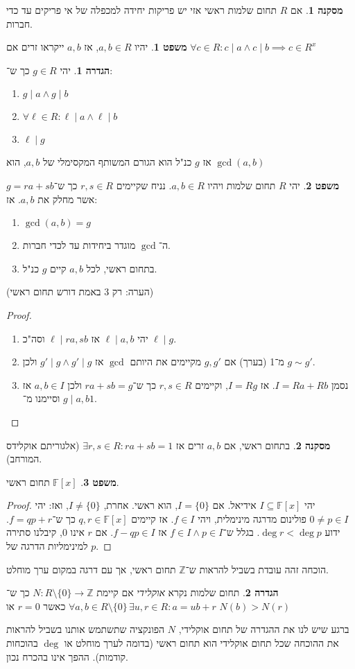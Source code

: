 \documentclass[a4paper]{article}
\newcommand\Z     {\mathbb{Z}}
\newcommand\ml    {\ell}
\newcommand\F         {\mathbb{F}}
\newcommand\co        {\colon}
\theoremstyle{definition}
\newtheorem{Theorem}{משפט}
\newtheorem{definition}{הגדרה}
\newtheorem{Collary}{מסקנה}
\newcommand\cola [1] {\begin{Collary}#1\end{Collary}}
\newcommand\theo  [1] {\begin{Theorem}#1\end{Theorem}}
\newcommand\defi  [1] {\begin{definition}#1\end{definition}}
\begin{document}
	\cola{אם $R$ תחום שלמות ראשי אזי יש פריקות יחידה למכפלה של אי פריקים עד כדי חברות. }
	
	\theo{יהיו $a, b \in R$, אז $a, b$ ייקראו זרים אם $\forall c \in R\co c \mid a \land c \mid b \implies c \in R^x$}
	\defi{יהי $g \in R$ כך ש־:
		\begin{enumerate}
			\item $g \mid a \land g \mid b$
			\item $\forall \ml \in R \co \ml \mid a \land \ml \mid b$
			\item $\ml \mid g$
		\end{enumerate}
		אז $g$ כנ"ל הוא הגורם המשותף המקסימלי של $a, b$, הוא $\gcd(a, b)$}
	
	\theo{יהי $R$ תחום שלמות ויהיו $a, b \in R$. נניח שקיימים $r, s \in R$ כך ש־$g = ra + sb$ אשר מחלק את $a, b$. אז: 
		\begin{enumerate}
			\item $\gcd(a, b) = g$
			\item ה־$\gcd$ מוגדר ביחידות עד לכדי חברות. 
			\item בתחום ראשי, לכל $a, b$ קיים $g$ כנ"ל. 
	\end{enumerate}}
	(הערה: רק 3 באמת דורש תחום ראשי)
	\begin{proof}\,
		\begin{enumerate}
			\item יהי $\ml \mid a, b$ אז $\ml \mid ra, sb$ וסה"כ $\ml \mid g$. 
			\item מ־1 (בערך) אם $g, g'$ מקיימים את היותם $\gcd$ אז $g' \mid g \land g' \mid g$ ולכן $g \sim g'$. 
			\item נסמן $I = Ra + Rb$. אז $I = Rg$, וקיימים $r, s \in R$ כך ש־$ra + sb = g$ ולכן $a, b \in I$ אז $g \mid a, b$ וסיימנו מ־$1$. 
		\end{enumerate}
	\end{proof}
	\cola{בתחום ראשי, אם $a, b$ זרים אז $\exists r, s \in R\co ra + sb = 1$ (אלגוריתם אוקלידס המורחב). }
	\theo{$\F[x]$ תחום ראשי. }
	\begin{proof}
		יהי $I \subseteq \F[x]$ אידיאל. אם $I = \{0\}$, הוא ראשי. אחרת, $I \neq \{0\}$, ואז: יהי $0 \neq p \in I$ פולינום מדרגה מינימלית, ויהי $f \in I$. אז קיימים $q, r \in \F[x]$ כך ש־$f = qp + r$. ידוע $\deg r < \deg p$. בגלל ש־$f \in I \land p \in I$ אז $f - qp \in I$. אם $r$ אינו $0$, קיבלנו סתירה למינימליות הדרגה של $p$. 
	\end{proof}
	הוכחה זהה עובדת בשביל להראות ש־$\Z$ תחום ראשי, אך עם דרגה במקום ערך מוחלט. 
	
	\defi{תחום שלמות נקרא \textit{אוקלידי} אם קיימת $N \co R \setminus \{0\} \to \Z$ כך ש־$\forall a, b \in R\setminus \{0\} \, \exists u, r \in R \co a = ub + r$ כאשר $r = 0$ או $N(b) > N(r)$}
	ברגע שיש לנו את ההגדרה של תחום אוקלידי, $N$ הפונקציה שתשתמש אותנו בשביל להראות את ההוכחה שכל תחום אוקלידי הוא תחום ראשי (בדומה לערך מוחלט או $\deg$ בהוכחות קודמות). ההפך אינו בהכרח נכון. 
	
\end{document}

